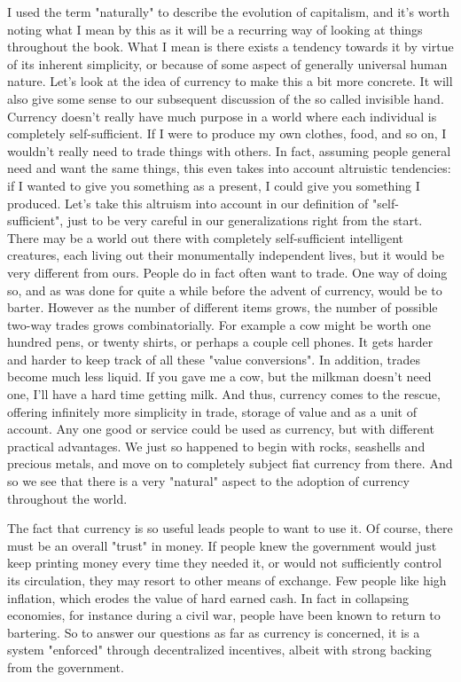 \documentclass[12pt]{memoir}
\begin{document}
			I used the term "naturally" to describe the evolution of capitalism, and it's worth noting what I mean by this as it will be a recurring way of looking at things throughout the book. What I mean is 
			there exists a tendency towards it by virtue of its inherent simplicity, or because of some aspect of generally universal human nature. Let's look at the idea of currency to make this a bit more 
			concrete. It will also give some sense to our subsequent discussion of the so called invisible hand. Currency doesn't really have much purpose in a world where each individual is completely 
			self-sufficient. If I were to produce my own clothes, food, and so on, I wouldn't really need to trade things with others. In fact, assuming people general need and want the same things, this even takes 
			into account altruistic tendencies: if I wanted to give you something as a present, I could give you something I produced. Let's take this altruism into account in our definition of "self-sufficient", just to be 
			very careful in our generalizations right from the start. There may be a world out there with completely self-sufficient intelligent creatures, each living out their monumentally independent lives, but it 
			would be very different from ours. People do in fact often want to trade. One way of doing so, and as was done for quite a while before the advent of currency, would be to barter. However as the 
			number of different items grows, the number of possible two-way trades grows combinatorially. For example a cow might be worth one hundred pens, or twenty shirts, or perhaps a couple cell phones. It 
			gets harder and harder to keep track of all these "value conversions". In addition, trades become much less liquid. If you gave me a cow, but the milkman doesn't need one, I'll have a hard time getting milk. 
			And thus, currency comes to the rescue, offering infinitely more simplicity in trade, storage of value and as a unit of account. Any one good or service could be used as currency, but with different 
			practical advantages. We just so happened to begin with rocks, seashells and precious metals, and move on to completely subject fiat currency from there. And so we see that there is a very "natural" aspect 
			to the adoption of currency throughout the world.\
			
			The fact that currency is so useful leads people to want to use it. Of course, there must be an overall "trust" in money. If people knew the government would just keep printing money every time they needed it, 
			or would not sufficiently control its circulation, they may resort to other means of exchange. Few people like high inflation, which erodes the value of hard earned cash. In fact in collapsing economies, for instance 
			during a civil war, people have been known to return to bartering. So to answer our questions as far as currency is concerned, it is a system "enforced" through decentralized incentives, albeit with strong 
			backing from the government.\
			
\end{document}
